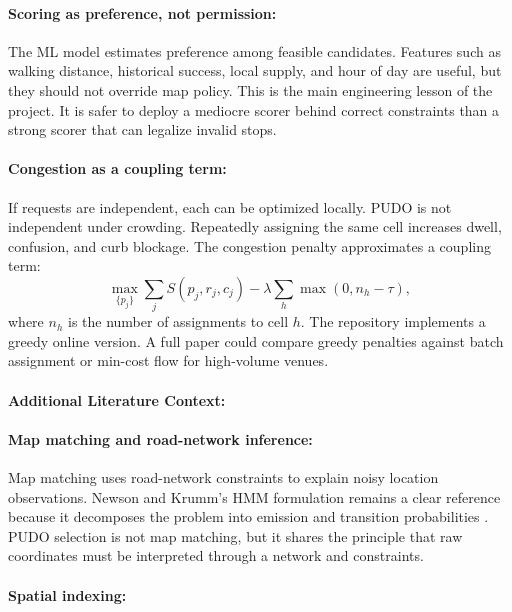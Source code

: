 \documentclass{article}
\begin{document}
\paragraph{Scoring as preference, not permission:}

The ML model estimates preference among feasible candidates. Features such as walking distance, historical success, local supply, and hour of day are useful, but they should not override map policy. This is the main engineering lesson of the project. It is safer to deploy a mediocre scorer behind correct constraints than a strong scorer that can legalize invalid stops.

\paragraph{Congestion as a coupling term:}

If requests are independent, each can be optimized locally. PUDO is not independent under crowding. Repeatedly assigning the same cell increases dwell, confusion, and curb blockage. The congestion penalty approximates a coupling term:
\begin{equation}
  \max_{\{p_j\}}\sum_j S(p_j,r_j,c_j)-\lambda\sum_h \max(0,n_h-\tau),
\end{equation}
where $n_h$ is the number of assignments to cell $h$. The repository implements a greedy online version. A full paper could compare greedy penalties against batch assignment or min-cost flow for high-volume venues.

\paragraph{Additional Literature Context:}

\paragraph{Map matching and road-network inference:}

Map matching uses road-network constraints to explain noisy location observations. Newson and Krumm's HMM formulation remains a clear reference because it decomposes the problem into emission and transition probabilities \citep{newson2009hidden}. PUDO selection is not map matching, but it shares the principle that raw coordinates must be interpreted through a network and constraints.

\paragraph{Spatial indexing:}
\end{document}
